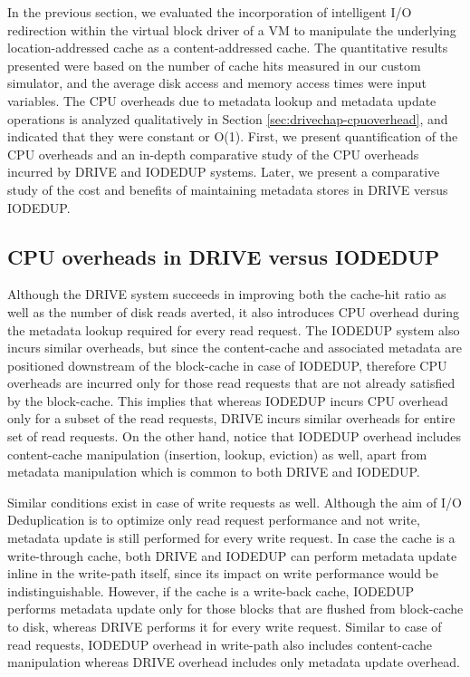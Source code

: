 
In the previous section, we evaluated the incorporation of
intelligent I/O redirection within the virtual block driver of a VM
to manipulate the underlying location-addressed cache as a content-addressed cache.
The quantitative results presented were based on the number of cache hits 
measured in our custom simulator, and the average disk access and memory 
access times were input variables. The CPU overheads due to metadata 
lookup and metadata update operations is analyzed qualitatively in 
Section \ref{sec:drivechap-cpuoverhead}, and indicated that they were 
constant or O(1). 
First, we present quantification of the CPU overheads and an
in-depth comparative study of the CPU overheads incurred by DRIVE and
IODEDUP systems. Later, we present a comparative study of the cost
and benefits of maintaining metadata stores in DRIVE versus IODEDUP.

\subsection{CPU overheads in DRIVE versus IODEDUP}
Although the DRIVE system succeeds in improving both the cache-hit ratio
as well as the number of disk reads averted, it also introduces CPU overhead
during the metadata lookup required for every read request. The IODEDUP system
also incurs similar overheads, but since the content-cache and associated
metadata are positioned downstream of the block-cache in case of IODEDUP,
therefore CPU overheads are incurred only for those read requests that are not
already satisfied by the block-cache. This implies that whereas IODEDUP
incurs CPU overhead only for a subset of the read requests, DRIVE incurs
similar overheads for entire set of read requests.
On the other hand, notice that IODEDUP overhead includes content-cache
manipulation (insertion, lookup, eviction) as well, apart from metadata
manipulation which is common to both DRIVE and IODEDUP.

Similar conditions exist in case of write requests as well. Although the
aim of I/O Deduplication is to optimize only read request performance and
not write, metadata update is still performed for every write request. In
case the cache is a write-through cache, both DRIVE and IODEDUP can
perform metadata update inline in the write-path itself, since its impact
on write performance would be indistinguishable. However, if the cache is
a write-back cache, IODEDUP performs metadata update only for those blocks
that are flushed from block-cache to disk, whereas DRIVE performs it
for every write request. Similar to case of read requests, IODEDUP overhead
in write-path also includes content-cache manipulation whereas DRIVE
overhead includes only metadata update overhead.

